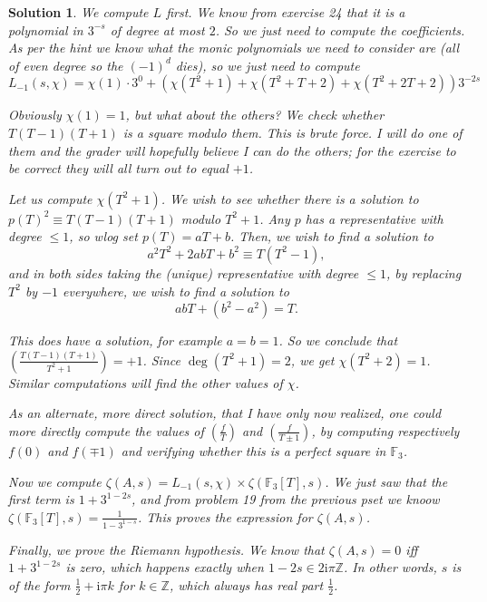 \documentclass{article}
\theoremstyle{nonumberplain}
\newtheorem{sol}{Solution}
\newcommand{\Z}{\mathbb{Z}}
\newcommand{\FF}{\mathbb{F}}
\newcommand{\I}{\mathrm{i}}
\newcommand{\legendre}[2]{\genfrac{(}{)}{}{}{#1}{#2}}
\begin{document}
\begin{sol}
We compute $L$ first. We know from exercise 24 that it is a polynomial in $3^{-s}$ of degree at most $2$. So we just need to compute the coefficients. As per the hint we know what the monic polynomials we need to consider are (all of even degree so the $(-1)^d$ dies), so we just need to compute
\begin{equation}
L_{-1}(s,\chi) = \chi(1) \cdot 3^0 + (\chi(T^2 + 1) + \chi(T^2 + T + 2) + \chi(T^2 + 2T + 2)) 3^{-2s}
\end{equation}

Obviously $\chi(1) = 1$, but what about the others? We check whether $T(T-1)(T+1)$ is a square modulo them. This is brute force. I will do one of them and the grader will hopefully believe I can do the others; for the exercise to be correct they will all turn out to equal $+1$.

Let us compute $\chi(T^2 + 1)$. We wish to see whether there is a solution to $p(T)^2 \equiv T(T-1)(T+1)$ modulo $T^2 + 1$. Any $p$ has a representative with degree $\leq 1$, so wlog set $p(T) = a T + b$. Then, we wish to find a solution to
\begin{equation}
a^2 T^2 + 2 a b T + b^2 \equiv T(T^2 - 1),
\end{equation}
and in both sides taking the (unique) representative with degree $\leq 1$, by replacing $T^2$ by $-1$ everywhere, we wish to find a solution to
\begin{equation}
a b T + (b^2 - a^2) = T.
\end{equation}

This does have a solution, for example $a = b = 1$. So we conclude that $\legendre{T(T-1)(T+1)}{T^2 + 1} = +1$. Since $\deg(T^2 + 1) = 2$, we get $\chi(T^2 + 2) = 1$. Similar computations will find the other values of $\chi$.

As an alternate, more direct solution, that I have only now realized, one could more directly compute the values of $\legendre f T$ and $\legendre f {T\pm 1}$, by computing respectively $f(0)$ and $f(\mp 1)$ and verifying whether this is a perfect square in $\FF_3$.

\smallskip

Now we compute $\zeta(A,s) = L_{-1}(s,\chi) \times \zeta(\FF_3[T],s)$. We just saw that the first term is $1+3^{1-2s}$, and from problem 19 from the previous pset we knoow $\zeta(\FF_3[T],s) = \frac1{1-3^{1-s}}$. This proves the expression for $\zeta(A,s)$.

Finally, we prove the Riemann hypothesis. We know that $\zeta(A,s) = 0$ iff $1 + 3^{1-2s}$ is zero, which happens exactly when $1-2s \in 2 \I \pi \Z$. In other words, $s$ is of the form $\frac12 + \I \pi k$ for $k \in \Z$, which always has real part $\frac12$.
\end{sol}
\end{document}
